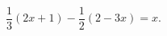 \begin{ex}[type=equation]
	\begin{condition}
		$\dfrac{1}{3}(2x+1) -\dfrac{1}{2}(2 - 3x) = x.$
	\end{condition}
\end{ex}